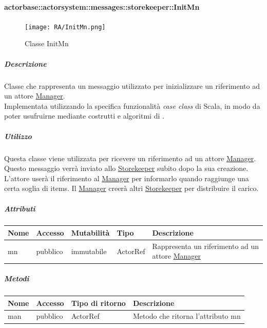 \documentclass{scalatekids-article}
\begin{document}
\paragraph{actorbase::actorsystem::messages::storekeeper::InitMn}
\label{sec:actorbase::actorsystem::messages::storekeeper::InitMn}

\begin{figure}[H]
  \begin{center}
    \texttt{[image: RA/InitMn.png]}
    \caption{Classe InitMn}
  \end{center}
\end{figure}

\subparagraph{Descrizione}
Classe che rappresenta un messaggio utilizzato per inizializzare un riferimento ad un attore \hyperref[sec:actorbase::actorsystem::actors::manager::Manager]{Manager}.\\Implementata utilizzando la specifica funzionalità \textit{case class} di Scala,
in modo da poter usufruirne mediante costrutti e algoritmi di
.

\subparagraph{Utilizzo}
Questa classe viene utilizzata per ricevere un riferimento ad un attore
\hyperref[sec:actorbase::actorsystem::actors::manager::Manager]{Manager}.
Questo messaggio verrà inviato allo \hyperref[sec:actorbase::actorsystem::actors::storekeeper::Storekeeper]{Storekeeper}
subito dopo la sua creazione.\\L'attore userà il riferimento al \hyperref[sec:actorbase::actorsystem::actors::manager::Manager]{Manager} per
informarlo quando raggiunge una certa soglia di items. Il \hyperref[sec:actorbase::actorsystem::actors::manager::Manager]{Manager} creerà altri
\hyperref[sec:actorbase::actorsystem::actors::storekeeper::Storekeeper]{Storekeeper} per distribuire il carico.

\subparagraph{Attributi}
\begin{tabular}{| p{2cm} | p{1.5cm} | p{2cm} | p{3cm} | p{8.5cm} |}
  \hline
  Nome & Accesso & Mutabilità & Tipo & Descrizione\\
  \hline
  mn & pubblico & immutabile & ActorRef & Rappresenta un riferimento ad un attore \hyperref[sec:actorbase::actorsystem::actors::manager::Manager]{Manager}\\
  \hline
\end{tabular}

\subparagraph{Metodi}
\begin{tabular}{| p{3cm} | p{1.5cm} | p{3.5cm} | p{9cm} |}
  \hline
  Nome & Accesso & Tipo di ritorno & Descrizione\\
  \hline
  man & pubblico & ActorRef & Metodo che ritorna l'attributo mn\\
  \hline
\end{tabular}
\end{document}
